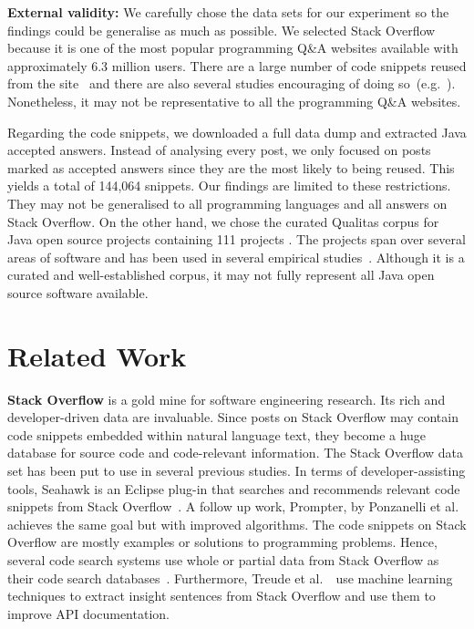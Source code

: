 \documentclass[sigconf,review, anonymous]{acmart}
\begin{document}
\textbf{External validity:} We carefully chose the data sets for our
experiment so the findings could be generalise as much as possible. 
We selected Stack Overflow because it is one of the most popular programming Q\&A websites available with approximately 6.3 million users.
There are a large number of code snippets reused from the site~\cite{An2017} and there are also several studies encouraging of doing so~(e.g.~\cite{Ponzanelli2013,Ponzanelli2014,Keivanloo2014,Park2014}). 
Nonetheless, it may not be representative to all the programming Q\&A websites. 

Regarding the code snippets, we downloaded a full data dump and extracted Java accepted answers. Instead of analysing every post, we only focused on posts marked as accepted answers 
since they are the most likely to being reused. This yields a total of 144,064 snippets.
Our findings are limited to these restrictions. They may not be generalised to all programming languages and all answers on Stack Overflow. On the other hand, we chose the curated Qualitas corpus for Java open source projects containing 111 projects \cite{QualitasCorpus}.
The projects span over several areas of software and has been used in several empirical studies~\cite{Taube-Schock2011,Beckman2011,Vasilescu2011,Omar2012}. Although it is a curated and well-established corpus, 
it may not fully represent all Java open source software available. 


\section{Related Work}

\textbf{Stack Overflow} is a gold mine for software engineering research. Its rich and developer-driven data are invaluable. Since posts on Stack Overflow may contain code snippets embedded within natural language text, they become a huge database for source code and code-relevant information. The Stack Overflow data set has been put to use in several previous studies. In terms of developer-assisting tools, Seahawk is an Eclipse plug-in that searches and recommends relevant code snippets from Stack Overflow~\cite{Ponzanelli2013}. A follow up work, Prompter, by Ponzanelli et al.~\cite{Ponzanelli2014} achieves the same goal but with improved algorithms. The code snippets on Stack Overflow are mostly examples or solutions to programming problems. Hence, several code search systems use whole or partial data from Stack Overflow as their code search databases~\cite{Keivanloo2014,Park2014, Stolee2014,Subramanian2013,Diamantopoulos2015}. Furthermore, Treude et al.~\cite{Treude2016}~use machine learning techniques to extract insight sentences from Stack Overflow and use them to improve API documentation.
\end{document}
